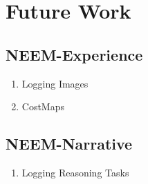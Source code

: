 \chapter{Future Work}

\section{NEEM-Experience}
\begin{enumerate}
	\item Logging Images
	\item CostMaps
\end{enumerate}

\section{NEEM-Narrative}
\begin{enumerate}
	\item Logging Reasoning Tasks
\end{enumerate}